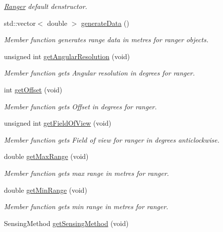 \begin{DoxyCompactItemize}
\begin{DoxyCompactList}\small\item\em \hyperlink{classRanger}{Ranger} default denstructor. \end{DoxyCompactList}\item 
std\+::vector$<$ double $>$ \hyperlink{classRanger_a2b76dc3e21da8a7abac830d09fa81241}{generate\+Data} ()
\begin{DoxyCompactList}\small\item\em Member function generates range data in metres for ranger objects. \end{DoxyCompactList}\item 
unsigned int \hyperlink{classRanger_a95b5013ae191d1e19b93fab002306718}{get\+Angular\+Resolution} (void)
\begin{DoxyCompactList}\small\item\em Member function gets Angular resolution in degrees for ranger. \end{DoxyCompactList}\item 
int \hyperlink{classRanger_a1c31d9a6c6a1c6ebd6325b36640b3576}{get\+Offset} (void)
\begin{DoxyCompactList}\small\item\em Member function gets Offset in degrees for ranger. \end{DoxyCompactList}\item 
unsigned int \hyperlink{classRanger_a4bca7dce56b7959257d90b1f30bf0271}{get\+Field\+Of\+View} (void)
\begin{DoxyCompactList}\small\item\em Member function gets Field of view for ranger in degrees anticlockwise. \end{DoxyCompactList}\item 
double \hyperlink{classRanger_aba5e81260e55089d9ff869051156a722}{get\+Max\+Range} (void)
\begin{DoxyCompactList}\small\item\em Member function gets max range in metres for ranger. \end{DoxyCompactList}\item 
double \hyperlink{classRanger_a646a06d3916179b9ebc4502bad169eec}{get\+Min\+Range} (void)
\begin{DoxyCompactList}\small\item\em Member function gets min range in metres for ranger. \end{DoxyCompactList}\item 
Sensing\+Method \hyperlink{classRanger_a2bcd122b3e549dc2525e04fa4dedc8ff}{get\+Sensing\+Method} (void)

\end{DoxyCompactItemize}

